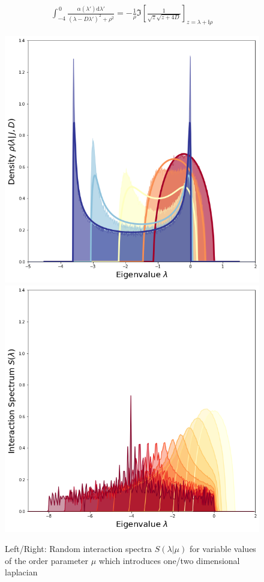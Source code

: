 \documentclass{article}[12pt]
\numberwithin{equation}{section}
\begin{document}
\begin{align}
  \int_{-4}^{\,0}\frac{\alpha(\lambda')\mathrm{d}\lambda'}{(\lambda-D\lambda')^2+\rho^2}=
    -\frac{1}{\rho}
        \Im\left[
          \frac{1}{\sqrt{z}\sqrt{z+4D}}
        \right]_{z=\lambda+\mathbb{i}\rho}
\end{align}
\begin{figure}[H]
\centering{}
\captionsetup{justification=centering}
\includegraphics[scale=0.3]{figures/interaction1d}
\includegraphics[scale=0.3]{figures/interaction2d}
\caption{Left/Right: Random interaction spectra $S(\lambda|\mu)$ for variable
values of the order parameter $\mu$ which introduces one/two dimensional laplacian}
\label{fig:spectrum}
\end{figure}



\end{document}
